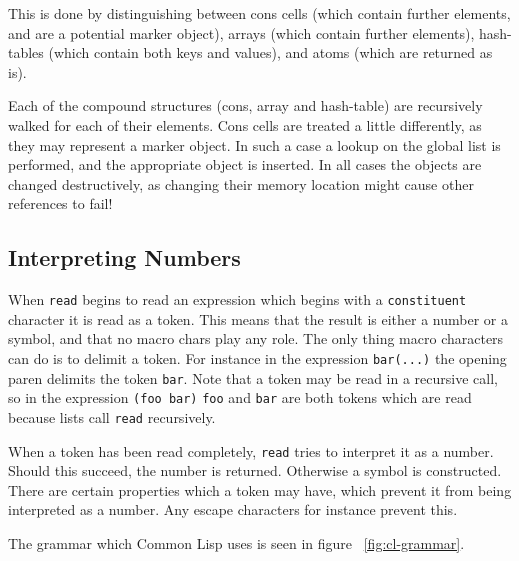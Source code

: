 \documentclass[a4paper,10pt,twoside]{report}
\newcommand{\cl}{Common Lisp}
\newcommand{\fun}[1]{\texttt{#1}}
\newcommand{\Read}{\fun{read}}
\begin{document}
This is done by distinguishing between cons cells (which contain further
elements, and are a potential marker object), arrays (which contain further
elements), hash-tables (which contain both keys and values), and atoms (which
are returned as is).

Each of the compound structures (cons, array and hash-table) are recursively
walked for each of their elements.  Cons cells are treated a little differently,
as they may represent a marker object.  In such a case a lookup on the global
list is performed, and the appropriate object is inserted.  In all cases the
objects are changed destructively, as changing their memory location might cause
other references to fail!

\subsection{Interpreting Numbers}
\label{subsec:interpreting-numbers}

When \Read{} begins to read an expression which begins with a
\texttt{constituent} character it is read as a token.  This means that the
result is either a number or a symbol, and that no macro chars play any role.
The only thing macro characters can do is to delimit a token.  For instance in
the expression \texttt{bar(...)} the opening paren delimits the token
\texttt{bar}.  Note that a token may be read in a recursive call, so in the
expression \texttt{(foo bar)} \texttt{foo} and \texttt{bar} are both tokens
which are read because lists call \Read{} recursively.

When a token has been read completely, \Read{} tries to interpret it as a
number.  Should this succeed, the number is returned.  Otherwise a symbol is
constructed.  There are certain properties which a token may have, which prevent
it from being interpreted as a number.  Any escape characters for instance
prevent this.

The grammar which \cl{} uses is seen in figure ~\ref{fig:cl-grammar}.
\end{document}
